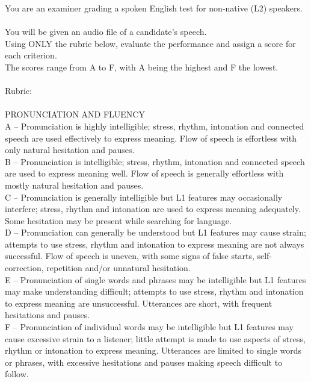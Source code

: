 \documentclass{report}
\begin{document}
\begingroup
\small
\begin{tcolorbox}[breakable, colback=white, colframe=black, title=Rubric-based Question Set Batch Prompt]
\small
You are an examiner grading a spoken English test for non-native (L2) speakers.\\
\\
You will be given an audio file of a candidate's speech.\\
Using ONLY the rubric below, evaluate the performance and assign a score for each criterion.\\
The scores range from A to F, with A being the highest and F the lowest.\\
\\
Rubric:\\
\\
PRONUNCIATION AND FLUENCY\\
A -- Pronunciation is highly intelligible; stress, rhythm, intonation and connected speech are used effectively to express meaning. Flow of speech is effortless with only natural hesitation and pauses.\\
B -- Pronunciation is intelligible; stress, rhythm, intonation and connected speech are used to express meaning well. Flow of speech is generally effortless with mostly natural hesitation and pauses.\\
C -- Pronunciation is generally intelligible but L1 features may occasionally interfere; stress, rhythm and intonation are used to express meaning adequately. Some hesitation may be present while searching for language.\\
D -- Pronunciation can generally be understood but L1 features may cause strain; attempts to use stress, rhythm and intonation to express meaning are not always successful. Flow of speech is uneven, with some signs of false starts, self-correction, repetition and/or unnatural hesitation.\\
E -- Pronunciation of single words and phrases may be intelligible but L1 features may make understanding difficult; attempts to use stress, rhythm and intonation to express meaning are unsuccessful. Utterances are short, with frequent hesitations and pauses.\\
F -- Pronunciation of individual words may be intelligible but L1 features may cause excessive strain to a listener; little attempt is made to use aspects of stress, rhythm or intonation to express meaning. Utterances are limited to single words or phrases, with excessive hesitations and pauses making speech difficult to follow.\\

\end{tcolorbox}
\end{document}
